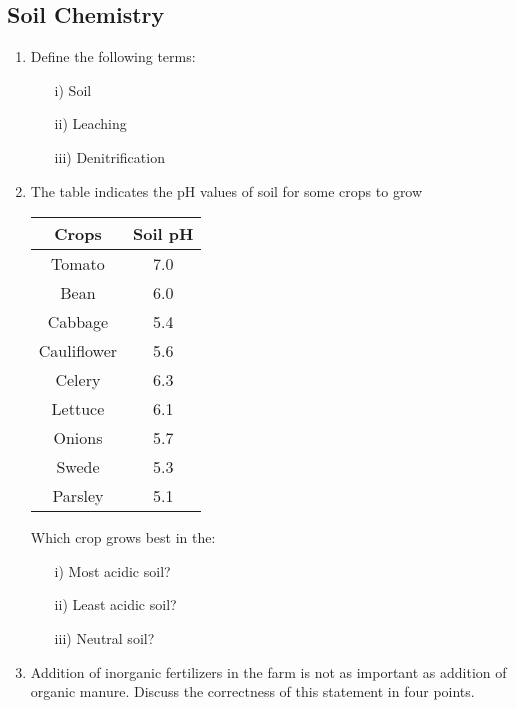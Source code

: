 \subsection{Soil Chemistry}

\begin{enumerate}
	\item Define the following terms:
	\begin{enumerate}[topsep=0ex,itemsep=0ex,partopsep=1ex,parsep=1ex]
		\item[i)] Soil
		\item[ii)] Leaching
		\item[iii)] Denitrification
	\end{enumerate}
	
	\item The table indicates the pH values of soil for some crops to grow
	\begin{center}
		\begin{tabular}{|c|c|} \hline
			\textbf{Crops} & \textbf{Soil pH} \\ \hline
			Tomato & 7.0 \\ \hline
			Bean & 6.0 \\ \hline
			Cabbage & 5.4 \\ \hline
			Cauliflower & 5.6 \\ \hline
			Celery & 6.3 \\ \hline
			Lettuce & 6.1 \\ \hline
			Onions & 5.7 \\ \hline
			Swede & 5.3 \\ \hline
			Parsley & 5.1 \\ \hline
		\end{tabular}
	\end{center}
	Which crop grows best in the:
	\begin{enumerate}[topsep=0ex,itemsep=0ex,partopsep=1ex,parsep=1ex]
		\item[i)] Most acidic soil?
		\item[ii)] Least acidic soil?
		\item[iii)] Neutral soil?
	\end{enumerate}
	
	\item Addition of inorganic fertilizers in the farm is not as important as addition of organic manure. Discuss the correctness of this statement in four points. 
	
\end{enumerate}









